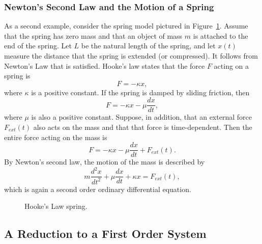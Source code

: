 \subsubsection*{Newton's Second Law and the Motion of a Spring}
 

As a second example, consider the spring model pictured in
Figure~\ref{F:spring2}.  Assume that the spring has zero mass and that
an object of mass $m$ is attached to the end of the spring.  Let $L$ be
the natural length of the spring, and let $x(t)$ measure the distance
that the spring is extended (or compressed).  It follows from Newton's
Law that  is satisfied.  Hooke's law 
states that the force $F$ acting on a spring is
\[
 F = -\kappa x,
\]
where $\kappa$ is a positive constant.  If the spring is damped by
sliding friction, then
\[
F=-\kappa x - \mu \frac{dx}{dt},
\]
where $\mu$ is also a positive constant.  Suppose, in addition, that
an external force $F_{ext}(t)$ also acts on the
mass and that that
force is time-dependent.  Then the entire force acting on the mass is
\[
F=-\kappa x - \mu \frac{dx}{dt}+F_{ext}(t).
\]
By Newton's second law, the motion of the mass is described by
\begin{equation}  \label{e:springeq}
m\frac{d^2x}{dt^2} + \mu\frac{dx}{dt} + \kappa x = F_{ext}(t),
\end{equation}
which is again a second order ordinary differential equation.
\begin{figure}[thb]
      \centerline{%
      }
      \caption{Hooke's Law spring.}
      \label{F:spring2}
\end{figure}


\subsection*{A Reduction to a First Order System}


